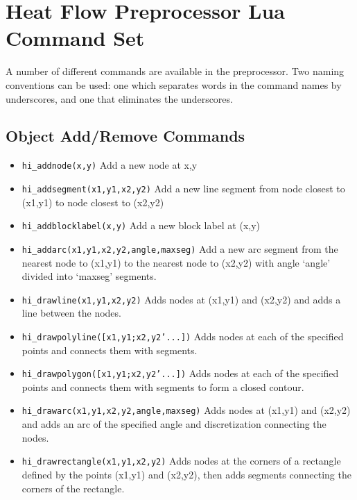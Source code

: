 \section{Heat Flow Preprocessor Lua Command Set}

A number of different commands are available in the preprocessor.
Two naming conventions can be used: one which separates words in
the command names by underscores, and one that eliminates the
underscores.

\subsection{Object Add/Remove Commands}
\begin{itemize}
\item {\tt hi\_addnode(x,y)} Add a new node at x,y

\item {\tt hi\_addsegment(x1,y1,x2,y2)} Add a new line segment from node closest to
(x1,y1) to node closest to (x2,y2)

\item {\tt hi\_addblocklabel(x,y)} Add a new block label at (x,y)

\item {\tt hi\_addarc(x1,y1,x2,y2,angle,maxseg)} Add a new arc segment from the
nearest node to (x1,y1) to the nearest node to (x2,y2) with angle `angle'
divided into `maxseg' segments.

\item{\tt hi\_drawline(x1,y1,x2,y2)} Adds nodes at (x1,y1) and
(x2,y2) and adds a line between the nodes.

\item{\tt hi\_drawpolyline([x1,y1;x2,y2'...])} Adds nodes at each
of the specified points and connects them with segments.

\item{\tt hi\_drawpolygon([x1,y1;x2,y2'...])} Adds nodes at each
of the specified points and connects them with segments to form a
closed contour.

\item{\tt hi\_drawarc(x1,y1,x2,y2,angle,maxseg)} Adds nodes at
(x1,y1) and (x2,y2) and adds an arc of the specified angle and
discretization connecting the nodes.

\item{\tt hi\_drawrectangle(x1,y1,x2,y2)} Adds nodes at the
corners of a rectangle defined by the points (x1,y1) and (x2,y2),
then adds segments connecting the corners of the rectangle.


\end{itemize}
